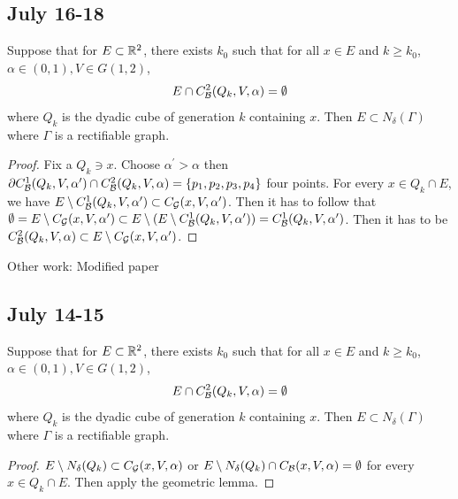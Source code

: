 \newpage
\subsection{July 16-18}
\begin{lemma}
    Suppose that for $E\subset \mathbb{R}^2$, there exists $k_0$ such that for all $x\in E$ and $k\geq k_0$, $\alpha\in(0,1), V\in G(1,2)$,
    \begin{equation*}
        E\cap C_\mathcal B^2(Q_k, V, \alpha) = \emptyset
    \end{equation*}
    where $Q_k$ is the dyadic cube of generation $k$ containing $x$. Then $E\subset N_\delta(\Gamma)$ where $\Gamma$ is a rectifiable graph. 
\end{lemma}

\begin{proof}
    Fix a $Q_k\ni x$. Choose $\alpha^\prime>\alpha$ then $\partial C_\mathcal B^1(Q_k, V, \alpha^\prime) \cap C_\mathcal B^2(Q_k, V, \alpha) = \{p_1, p_2, p_3, p_4\}$ four points. For every $x\in Q_k\cap E$, we have $E\setminus C_\mathcal B^1(Q_k, V, \alpha^\prime)\subset C_\mathcal G(x, V, \alpha^\prime)$. Then it has to follow that $\emptyset = E\setminus C_\mathcal G(x, V, \alpha^\prime) \subset E\setminus (E\setminus C_\mathcal B^1 (Q_k, V, \alpha^\prime)) = C_\mathcal B^1 (Q_k, V, \alpha^\prime)$. Then it has to be $C_\mathcal B^2 (Q_k, V, \alpha) \subset E\setminus C_\mathcal G(x, V, \alpha^\prime)$.
\end{proof}



Other work: Modified paper



\subsection{July 14-15}

\begin{lemma}
    Suppose that for $E\subset \mathbb{R}^2$, there exists $k_0$ such that for all $x\in E$ and $k\geq k_0$, $\alpha\in(0,1), V\in G(1,2)$,
    \begin{equation*}
        E\cap C_\mathcal B^2(Q_k, V, \alpha) = \emptyset
    \end{equation*}
    where $Q_k$ is the dyadic cube of generation $k$ containing $x$. Then $E\subset N_\delta(\Gamma)$ where $\Gamma$ is a rectifiable graph. 
\end{lemma}
\begin{proof}
    $E\setminus N_\delta(Q_k) \subset C_\mathcal G(x, V, \alpha)$ or $E\setminus N_\delta(Q_k)\cap C_\mathcal B(x, V, \alpha) = \emptyset$ for every $x\in Q_k\cap E$. Then apply the geometric lemma.
\end{proof}

